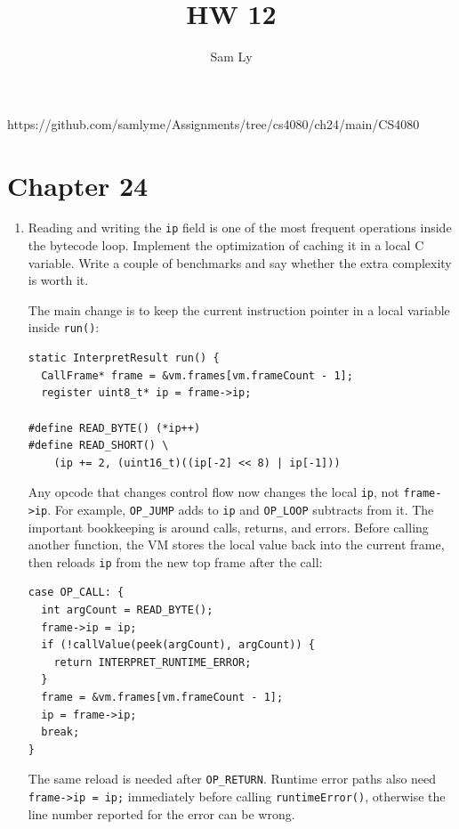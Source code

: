 \documentclass{article}
\title{HW 12}
\author{Sam Ly}
\begin{document}
\maketitle

https://github.com/samlyme/Assignments/tree/cs4080/ch24/main/CS4080

\section*{Chapter 24}

\begin{enumerate}
    \item {
        Reading and writing the \texttt{ip} field is one of the most frequent operations
        inside the bytecode loop. Implement the optimization of caching it in a local
        C variable. Write a couple of benchmarks and say whether the extra complexity
        is worth it.

        The main change is to keep the current instruction pointer in a local variable
        inside \texttt{run()}:

        \begin{verbatim}
static InterpretResult run() {
  CallFrame* frame = &vm.frames[vm.frameCount - 1];
  register uint8_t* ip = frame->ip;

#define READ_BYTE() (*ip++)
#define READ_SHORT() \
    (ip += 2, (uint16_t)((ip[-2] << 8) | ip[-1]))
        \end{verbatim}

        Any opcode that changes control flow now changes the local \texttt{ip}, not
        \texttt{frame->ip}. For example, \texttt{OP\_JUMP} adds to \texttt{ip} and
        \texttt{OP\_LOOP} subtracts from it. The important bookkeeping is around
        calls, returns, and errors. Before calling another function, the VM stores the
        local value back into the current frame, then reloads \texttt{ip} from the new
        top frame after the call:

        \begin{verbatim}
case OP_CALL: {
  int argCount = READ_BYTE();
  frame->ip = ip;
  if (!callValue(peek(argCount), argCount)) {
    return INTERPRET_RUNTIME_ERROR;
  }
  frame = &vm.frames[vm.frameCount - 1];
  ip = frame->ip;
  break;
}
        \end{verbatim}

        The same reload is needed after \texttt{OP\_RETURN}. Runtime error paths also
        need \texttt{frame->ip = ip;} immediately before calling \texttt{runtimeError()},
        otherwise the line number reported for the error can be wrong.

}
\end{enumerate}
\end{document}
